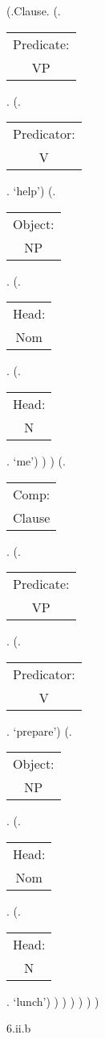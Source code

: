 \documentclass[12pt,letterpaper]{article}
\begin{document}
		\begin{figure}
	\begin{center}
		\begin{parsetree}
			(.Clause.
			(.\begin{tabular}{c}Predicate:\\VP\end{tabular}.
			(.\begin{tabular}{c}Predicator:\\V\end{tabular}.  `help')
			(.\begin{tabular}{c}Object:\\NP\end{tabular}.
			(.\begin{tabular}{c}Head:\\Nom\end{tabular}.
			(.\begin{tabular}{c}Head:\\N\end{tabular}. `me')
			)
			)
			(.\begin{tabular}{c}Comp:\\Clause\end{tabular}.
			(.\begin{tabular}{c}Predicate:\\VP\end{tabular}.
			(.\begin{tabular}{c}Predicator:\\V\end{tabular}. `prepare')
			(.\begin{tabular}{c}Object:\\NP\end{tabular}. 
			(.\begin{tabular}{c}Head:\\Nom\end{tabular}.
			(.\begin{tabular}{c}Head:\\N\end{tabular}. `lunch')
			)
			)
			)
			)
			)
			)
			
			\hfill \break\hfill \break
		\end{parsetree}
		6.ii.b
	\end{center}
\end{figure}
\end{document}
